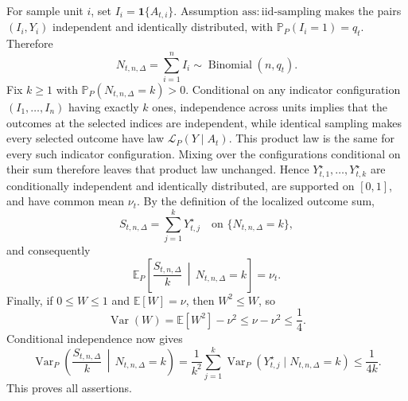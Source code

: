 For sample unit \(i\), set \(I_i=\mathbf1\{A_{t,i}\}\).  Assumption \(\mathrm{ass:iid\text{-}sampling}\) makes the pairs \((I_i,Y_i)\) independent and identically distributed, with \(\mathbb P_P(I_i=1)=q_t\).  Therefore
\[
 N_{t,n,\Delta}=\sum_{i=1}^n I_i\sim\operatorname{Binomial}(n,q_t).
\]
Fix \(k\geq1\) with \(\mathbb P_P(N_{t,n,\Delta}=k)>0\).  Conditional on any indicator configuration \((I_1,\ldots,I_n)\) having exactly \(k\) ones, independence across units implies that the outcomes at the selected indices are independent, while identical sampling makes every selected outcome have law \(\mathcal L_P(Y\mid A_t)\).  This product law is the same for every such indicator configuration.  Mixing over the configurations conditional on their sum therefore leaves that product law unchanged.  Hence \(Y_{t,1}^{\star},\ldots,Y_{t,k}^{\star}\) are conditionally independent and identically distributed, are supported on \([0,1]\), and have common mean \(\nu_t\).  By the definition of the localized outcome sum,
\[
 S_{t,n,\Delta}=\sum_{j=1}^kY_{t,j}^{\star}
 \quad\text{on }\{N_{t,n,\Delta}=k\},
\]
and consequently
\[
 \mathbb E_P\!\left[\frac{S_{t,n,\Delta}}k\,\middle|\,N_{t,n,\Delta}=k\right]=\nu_t.
\]
Finally, if \(0\leq W\leq1\) and \(\mathbb E[W]=\nu\), then \(W^2\leq W\), so
\[
 \operatorname{Var}(W)=\mathbb E[W^2]-\nu^2
 \leq\nu-\nu^2\leq\frac14.
\]
Conditional independence now gives
\[
 \operatorname{Var}_P\!\left(\frac{S_{t,n,\Delta}}k\,\middle|\,N_{t,n,\Delta}=k\right)
 =\frac1{k^2}\sum_{j=1}^k
 \operatorname{Var}_P(Y_{t,j}^{\star}\mid N_{t,n,\Delta}=k)
 \leq\frac1{4k}.
\]
This proves all assertions.